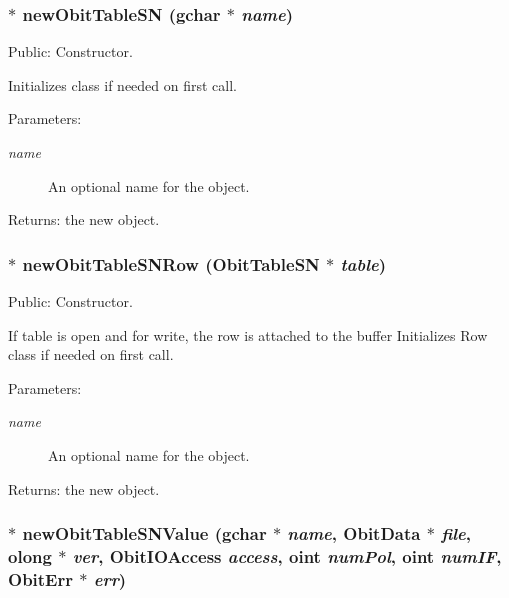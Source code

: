 \subsubsection{$\ast$ new\-Obit\-Table\-SN (gchar $\ast$ {\em name})}\label{ObitTableSN_8c_a16}


Public: Constructor. 

Initializes class if needed on first call. \begin{Desc}
\item[Parameters:]
\begin{description}
\item[{\em name}]An optional name for the object. \end{description}
\end{Desc}
\begin{Desc}
\item[Returns:]the new object. \end{Desc}
\subsubsection{$\ast$ new\-Obit\-Table\-SNRow ({\bf Obit\-Table\-SN} $\ast$ {\em table})}\label{ObitTableSN_8c_a14}


Public: Constructor. 

If table is open and for write, the row is attached to the buffer Initializes Row class if needed on first call. \begin{Desc}
\item[Parameters:]
\begin{description}
\item[{\em name}]An optional name for the object. \end{description}
\end{Desc}
\begin{Desc}
\item[Returns:]the new object. \end{Desc}
\subsubsection{$\ast$ new\-Obit\-Table\-SNValue (gchar $\ast$ {\em name}, {\bf Obit\-Data} $\ast$ {\em file}, {\bf olong} $\ast$ {\em ver}, Obit\-IOAccess {\em access}, {\bf oint} {\em num\-Pol}, {\bf oint} {\em num\-IF}, {\bf Obit\-Err} $\ast$ {\em err})}\label{ObitTableSN_8c_a18}


